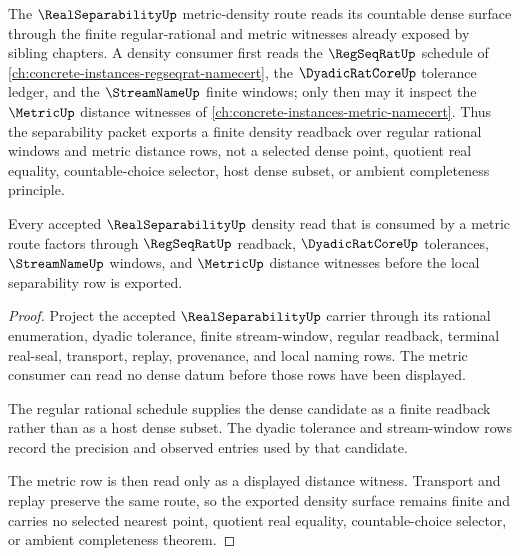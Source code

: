 The $\RealSeparabilityUp$ metric-density route reads its countable dense surface through the finite regular-rational and metric witnesses already exposed by sibling chapters. A density consumer first reads the $\RegSeqRatUp$ schedule of \autoref{ch:concrete-instances-regseqrat-namecert}, the $\DyadicRatCoreUp$ tolerance ledger, and the $\StreamNameUp$ finite windows; only then may it inspect the $\MetricUp$ distance witnesses of \autoref{ch:concrete-instances-metric-namecert}. Thus the separability packet exports a finite density readback over regular rational windows and metric distance rows, not a selected dense point, quotient real equality, countable-choice selector, host dense subset, or ambient completeness principle.

\begin{theorem}
\label{thm:real-separability-metric-density-route}
Every accepted $\RealSeparabilityUp$ density read that is consumed by a metric route factors through $\RegSeqRatUp$ readback, $\DyadicRatCoreUp$ tolerances, $\StreamNameUp$ windows, and $\MetricUp$ distance witnesses before the local separability row is exported.
\end{theorem}
\begin{proof}
Project the accepted $\RealSeparabilityUp$ carrier through its rational enumeration, dyadic tolerance, finite stream-window, regular readback, terminal real-seal, transport, replay, provenance, and local naming rows. The metric consumer can read no dense datum before those rows have been displayed.

The regular rational schedule supplies the dense candidate as a finite readback rather than as a host dense subset. The dyadic tolerance and stream-window rows record the precision and observed entries used by that candidate.

The metric row is then read only as a displayed distance witness. Transport and replay preserve the same route, so the exported density surface remains finite and carries no selected nearest point, quotient real equality, countable-choice selector, or ambient completeness theorem.
\end{proof}
